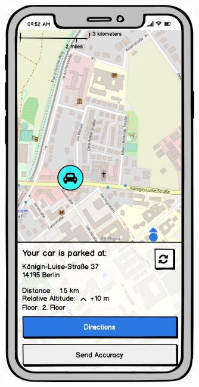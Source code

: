 \begin{figure}[h]
  \centering
  \begin{minipage}[b]{0.45\textwidth}
    \centering
    \includegraphics[width=0.75\textwidth]{images/UI/Iteration3-MapView-ParkingPositionDetermined.png}
  \end{minipage}
  \hfill
  \begin{minipage}[b]{0.45\textwidth}
    \centering

\end{minipage}
\end{figure}
